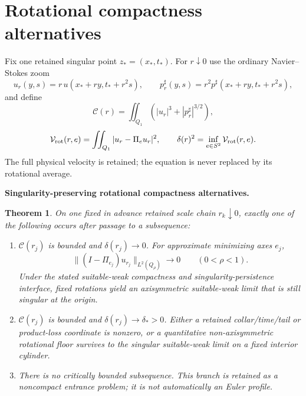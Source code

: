 \documentclass[11pt]{article}
\newtheorem{theorem}{Theorem}[section]
\theoremstyle{definition}\newtheorem{problem}[theorem]{Problem}
\theoremstyle{definition}
\theoremstyle{remark}
\begin{document}
\section{Rotational compactness alternatives}
\label{sec:symmetry-fork}

Fix one retained singular point $z_*=(x_*,t_*)$.  For $r\downarrow0$ use the
ordinary Navier--Stokes zoom
\[
 u_r(y,s)=r\,u(x_*+ry,t_*+r^2s),\qquad
 p_r^\sharp(y,s)=r^2p^\sharp(x_*+ry,t_*+r^2s),
\]
and define
\[
 \mathcal C(r)=\iint_{Q_1}(|u_r|^3+|p_r^\sharp|^{3/2}),
\]
\[
 \mathcal V_{\rm rot}(r,e)=\iint_{Q_1}|u_r-\Pi_eu_r|^2,
 \qquad
 \delta(r)^2=\inf_{e\in S^2}\mathcal V_{\rm rot}(r,e).
\]
The full physical velocity is retained; the equation is never replaced by its
rotational average.

\medskip
\noindent\textbf{Singularity-preserving rotational compactness alternatives.}
\begin{theorem}
\label{thm:abc}
On one fixed in advance retained scale chain $r_k\downarrow0$, exactly one of the
following occurs after passage to a subsequence:
\begin{enumerate}[label=(\roman*),leftmargin=*]
\item $\mathcal C(r_j)$ is bounded and $\delta(r_j)\to0$.  For approximate
minimizing axes $e_j$,
\[
 \|(I-\Pi_{e_j})u_{r_j}\|_{L^2(Q_\rho)}\to0
 \qquad (0<\rho<1).
\]
Under the stated suitable-weak compactness and singularity-persistence
interface, fixed rotations yield an axisymmetric suitable-weak limit that is
still singular at the origin.
\item $\mathcal C(r_j)$ is bounded and $\delta(r_j)\to\delta_*>0$.
Either a retained collar/time/tail or product-loss coordinate is nonzero, or a
quantitative non-axisymmetric rotational floor survives to the singular
suitable-weak limit on a fixed interior cylinder.
\item There is no critically bounded subsequence.  This branch is retained as
a noncompact entrance problem; it is not automatically an Euler profile.
\end{enumerate}
\end{theorem}
\end{document}
